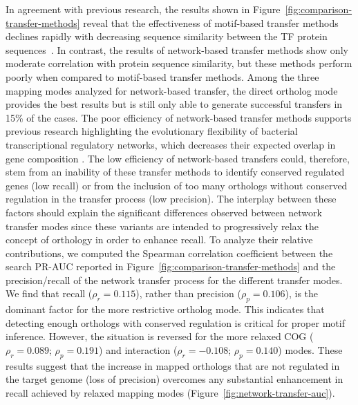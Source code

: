 In agreement with previous research, the results shown in
Figure~\ref{fig:comparison-transfer-methods} reveal that the effectiveness of
motif-based transfer methods declines rapidly with decreasing sequence
similarity between the TF protein sequences~\cite{yu2004annotation}. In
contrast, the results of network-based transfer methods show only moderate
correlation with protein sequence similarity, but these methods perform poorly
when compared to motif-based transfer methods. Among the three mapping modes
analyzed for network-based transfer, the direct ortholog mode provides the best
results but is still only able to generate successful transfers in 15\% of the
cases. The poor efficiency of network-based transfer methods supports previous
research highlighting the evolutionary flexibility of bacterial transcriptional
regulatory networks, which decreases their expected overlap in gene composition
\cite{venancio2009reconstructing, babu2006evolutionary, chavez2006bacterial,
  price2007orthologous}. The low efficiency of network-based transfers could,
therefore, stem from an inability of these transfer methods to identify
conserved regulated genes (low recall) or from the inclusion of too many
orthologs without conserved regulation in the transfer process (low
precision). The interplay between these factors should explain the significant
differences observed between network transfer modes since these variants are
intended to progressively relax the concept of orthology in order to enhance
recall. To analyze their relative contributions, we computed the Spearman
correlation coefficient between the search PR-AUC reported in
Figure~\ref{fig:comparison-transfer-methods} and the precision/recall of the
network transfer process for the different transfer modes. We find that recall
($\rho_r=0.115$), rather than precision ($\rho_p=0.106$), is the dominant
factor for the more restrictive ortholog mode. This indicates that detecting
enough orthologs with conserved regulation is critical for proper motif
inference. However, the situation is reversed for the more relaxed COG
($\rho_r=0.089$; $\rho_p =0.191$) and interaction ($\rho_r=-0.108$;
$\rho_p=0.140$) modes. These results suggest that the increase in mapped
orthologs that are not regulated in the target genome (loss of precision)
overcomes any substantial enhancement in recall achieved by relaxed mapping
modes (Figure~\ref{fig:network-transfer-auc}).

